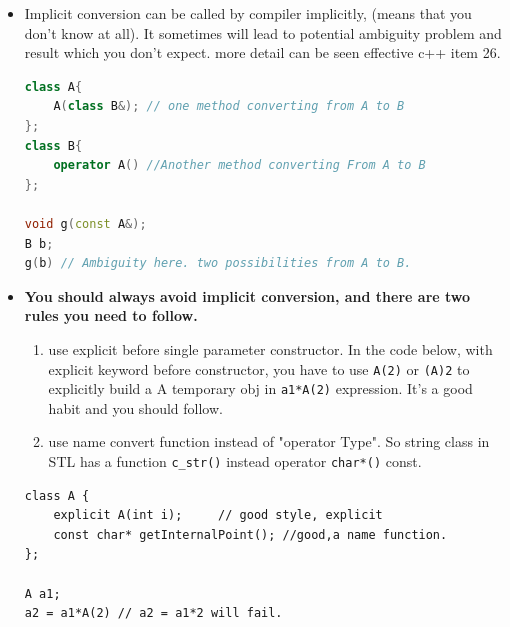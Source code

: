 \documentclass[a4paper,11pt,twoside]{book}
\begin{document}
\begin{itemize}
	\item Implicit conversion can be called by compiler implicitly, (means that you don't know at all). It sometimes will lead to potential ambiguity problem and result which you don't expect. more detail can be seen effective c++ item 26.
\begin{lstlisting}[frame=single, language=c++]
class A{
	A(class B&); // one method converting from A to B
};
class B{
	operator A() //Another method converting From A to B
};
	
void g(const A&);
B b;
g(b) // Ambiguity here. two possibilities from A to B. 
\end{lstlisting}
	
	\item \textbf{You should always avoid implicit conversion, and there are two rules you need to follow.}
	\begin{enumerate}
		\item use explicit before single parameter constructor. In the code below, with explicit keyword before constructor,  you have to use \texttt{A(2)} or \texttt{(A)2} to explicitly build a A temporary obj in \texttt{a1*A(2)} expression. It's a good habit and you should follow. 
		
		\item use name convert function instead of  "operator Type". So string class in STL has a function \texttt{c\_str()} instead operator \texttt{char*()} const. 
	\end{enumerate}
\begin{lstlisting}[numbers=none]
class A {
	explicit A(int i);     // good style, explicit
	const char* getInternalPoint(); //good,a name function.
};	

A a1;
a2 = a1*A(2) // a2 = a1*2 will fail. 
\end{lstlisting}	
	
\end{itemize}
\end{document}
